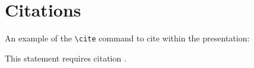 \section{Citations}
\label{section1}

An example of the \texttt{\textbackslash cite} command to cite within the presentation:

This statement requires citation \cite{Smith:2012qr}.

\clearpage